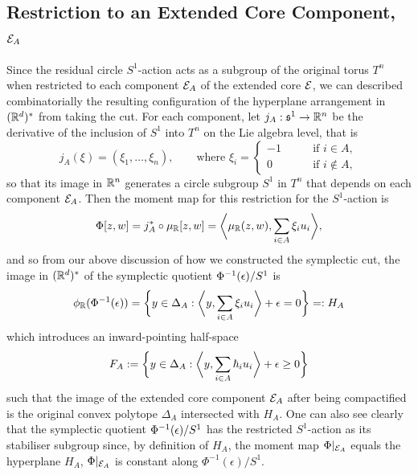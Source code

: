 \subsection{Restriction to an Extended Core Component, $\mathcal{E}_{A}$}

Since the residual circle $S^{1}$-action acts as a subgroup of the original torus $T^{n}$ when restricted to each component $\mathcal{E}_{A}$ of the extended core $\mathcal{E}$, we can described combinatorially the resulting configuration of the hyperplane arrangement in $(\mathbb{R}^{d})^{\ast}$ from taking the cut. For each component, let $j_{A}: \mathfrak{s}^{1} \rightarrow \mathbb{R}^{n}$ be the derivative of the inclusion of $S^{1}$ into $T^{n}$ on the Lie algebra level, that is
\begin{equation*}
	j_{A}( \xi  ) = (\xi_{1},\ldots, \xi_{n}),\qquad \text{where } \xi_{i} = 
	\begin{cases}
	-1\qquad&\text{if } i\in A,\\
	0\qquad &\text{if } i \not\in A,
	\end{cases}
\end{equation*}
so that its image in $\mathbb{R}^{n}$ generates a circle subgroup $S^{1}$ in $T^{n}$ that depends on each component $\mathcal{E}_{A}$. Then the moment map for this restriction for the $S^{1}$-action is
\begin{equation*}
	\Phi[z,w] = j_{A}^{\ast} \circ \mu_{\mathbb{R}}[z,w] = \bigg\langle \mu_{\mathbb{R}}(z,w), \sum_{i\in A}\xi_{i} u_{i} \bigg\rangle,
\end{equation*}
and so from our above discussion of how we constructed the symplectic cut, the image in $(\mathbb{R}^{d})^{\ast}$ of the symplectic quotient $\Phi^{-1}(\epsilon)/S^{1}$ is
\begin{equation*}
	\phi_{\mathbb{R}}(\Phi^{-1}(\epsilon)) = \bigg\{ y \in \Delta_{A} : \bigg\langle y, \sum_{i\in A}\xi_{i}u_{i}\bigg\rangle + \epsilon = 0 \bigg\} =: H_{A}
\end{equation*}
which introduces an inward-pointing half-space
\begin{equation*}
	F_{A} := \bigg\{ y \in \Delta_{A} : \bigg\langle y, \sum_{i\in A}\hbar_{i}u_{i}\bigg\rangle + \epsilon \geq 0 \bigg\}
\end{equation*}
such that the image of the extended core component $\mathcal{E}_{A}$ after being compactified is the original convex polytope $\Delta_{A}$ intersected with $H_{A}$. One can also see clearly that the symplectic quotient $\Phi^{-1}(\epsilon)/S^{1}$ has the restricted $S^{1}$-action as its stabiliser subgroup since, by definition of $H_{A}$, the moment map $\Phi|_{\mathcal{E}_{A}}$ equals the hyperplane $H_{A}$, \ie $\Phi|_{\mathcal{E}_{A}}$ is constant along $\Phi^{-1}(\epsilon)/S^{1}$.

